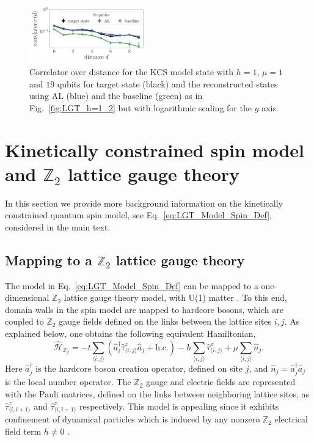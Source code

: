 \documentclass[pra,aps,showpacs,groupedaddress,superscriptaddress,twocolumn,toc=flat,biblatex,footinbib]{revtex4-1}
\renewcommand{\l}{\left(}
\renewcommand{\r}{\right)}
\renewcommand{\H}{\hat{\mathcal{H}}}
\renewcommand{\a}{\hat{a}}
\newcommand{\ad}{\hat{a}^\dagger}
\newcommand{\hc}{\text{h.c.}}
\newcommand{\Zt}{$\mathbb{Z}_2$ }
\begin{document}
\begin{figure}[t]
	\centering
   \includegraphics[width=0.45\textwidth]{Paper/Graphics/LGT_h=1_finite_mu_correlator_19_qubits_log.pdf}
	\caption[]{Correlator over distance for the KCS model state with $h=1$, $\mu=1$ and $19$ qubits for target state (black) and the reconstructed states using AL (blue) and the baseline (green) as in Fig.~\ref{fig:LGT_h=1_2} but with logarithmic scaling for the $y$ axis.}
	\label{fig:LGT_h=1_21}
\end{figure}



\section{Kinetically constrained spin model and $\mathbb{Z}_2$ lattice gauge theory}
\label{ApdxKinConsSpn}
In this section we provide more background information on the kinetically constrained quantum spin model, see Eq.~\eqref{eq:LGT_Model_Spin_Def}, considered in the main text.

\subsection{Mapping to a $\mathbb{Z}_2$ lattice gauge theory}
The model in Eq.~\eqref{eq:LGT_Model_Spin_Def} can be mapped to a one-dimensional \Zt lattice gauge theory model, with U(1) matter \cite{Borla2020,Kebric2021}. To this end, domain walls in the spin model are mapped to hardcore bosons, which are coupled to \Zt gauge fields defined on the links between the lattice sites $i,j$. As explained below, one obtains the following equivalent Hamiltonian,
\begin{equation}
    \H_{\mathbb{Z}_2} = -t \sum_{\langle i, j \rangle} \l \ad_i \hat{\tau}^{z}_{\langle i, j \rangle} \a_j + \hc \r
    - h \sum_{\langle i, j \rangle}
    \hat{\tau}^{x}_{\langle i, j \rangle}
    + \mu \sum_{\langle i, j \rangle} \hat{n}_j.
    \label{eq:LGT_Model_Original_Def}
\end{equation}
Here $\ad_j$ is the hardcore boson creation operator, defined on site $j$, and $\hat{n}_j = \ad_j \a_j$ is the local number operator. The \Zt gauge and electric fields are represented with the Pauli matrices, defined on the links between neighboring lattice sites, as $\hat{\tau}^{z}_{\langle i, i+1 \rangle}$ and $\hat{\tau}^{x}_{\langle i, i+1 \rangle}$ respectively. This model is appealing since it exhibits confinement of dynamical particles which is induced by any nonzero \Zt electrical field term $h \neq 0$ \cite{Borla2020,Kebric2021}.
\end{document}
